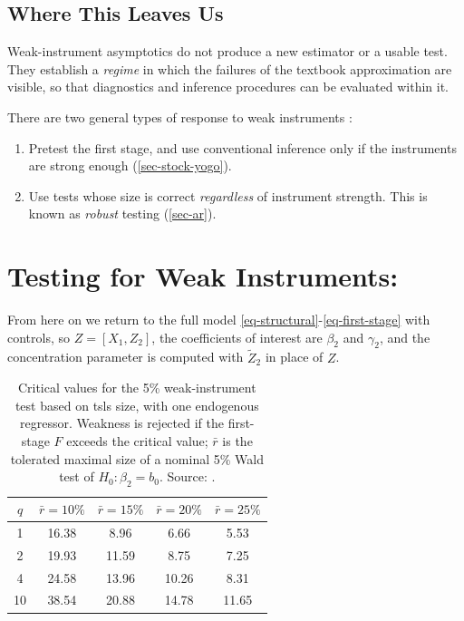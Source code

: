 \documentclass[a4paper,12pt]{article}
\begin{document}
\subsection{Where This Leaves Us}

Weak-instrument asymptotics do not produce a new estimator or a usable test.
They establish a \emph{regime} in which the failures of the textbook approximation are visible,
so that diagnostics and inference procedures can be evaluated within it.

\begin{remark}
	There are two general types of response to weak instruments \parencite{stock-wright-yogo-2002}:
	\begin{enumerate}
		\item Pretest the first stage, and use conventional inference only if the instruments are strong enough (\autoref{sec-stock-yogo}).
		\item Use tests whose size is correct \emph{regardless} of instrument strength. This is known as \emph{robust} testing (\autoref{sec-ar}).
	\end{enumerate}
\end{remark}

\section{Testing for Weak Instruments: \texorpdfstring{\textcite{stock-yogo-2005}}{Stock and Yogo (2005)}}\label{sec-stock-yogo}

From here on we return to the full model \eqref{eq-structural}-\eqref{eq-first-stage} with controls,
so $Z=[X_1,Z_2]$, the coefficients of interest are $\beta_2$ and $\gamma_2$,
and the concentration parameter is computed with $\tilde Z_2$ in place of $Z$.

\begin{table}[ht]
	\centering
	\begin{tabular}{ccccc}
		\toprule
		$q$ & $\bar r=10\%$ & $\bar r=15\%$ & $\bar r=20\%$ & $\bar r=25\%$\\
		\midrule
		1 & 16.38 & 8.96 & 6.66 & 5.53\\
		2 & 19.93 & 11.59 & 8.75 & 7.25\\
		4 & 24.58 & 13.96 & 10.26 & 8.31\\
		10 & 38.54 & 20.88 & 14.78 & 11.65\\
		\bottomrule
	\end{tabular}
	\caption{Critical values for the 5\% weak-instrument test based on \gls{tsls} size, with one endogenous regressor.
	Weakness is rejected if the first-stage $F$ exceeds the critical value;
	$\bar r$ is the tolerated maximal size of a nominal 5\% Wald test of $H_0:\beta_2=b_0$.
	Source: \textcite[Table 2]{stock-yogo-2005}.}
	\label{tab-stock-yogo}
\end{table}
\end{document}
